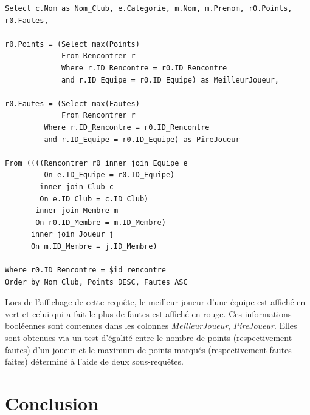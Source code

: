 \documentclass[a4paper»,8pt,french,fleqn]{report}
\begin{document}
\begin{lstlisting}
Select c.Nom as Nom_Club, e.Categorie, m.Nom, m.Prenom, r0.Points, r0.Fautes, 

r0.Points = (Select max(Points) 
             From Rencontrer r
             Where r.ID_Rencontre = r0.ID_Rencontre
             and r.ID_Equipe = r0.ID_Equipe) as MeilleurJoueur,

r0.Fautes = (Select max(Fautes) 
             From Rencontrer r
	     Where r.ID_Rencontre = r0.ID_Rencontre
	     and r.ID_Equipe = r0.ID_Equipe) as PireJoueur 
								
From ((((Rencontrer r0 inner join Equipe e
         On e.ID_Equipe = r0.ID_Equipe) 
        inner join Club c            
        On e.ID_Club = c.ID_Club) 
       inner join Membre m
       On r0.ID_Membre = m.ID_Membre) 
      inner join Joueur j
      On m.ID_Membre = j.ID_Membre)

Where r0.ID_Rencontre = $id_rencontre
Order by Nom_Club, Points DESC, Fautes ASC
\end{lstlisting}

Lors de l'affichage de cette requête, le meilleur joueur d'une équipe est affiché en vert et celui qui a fait le plus de fautes est affiché en rouge. Ces informations booléennes sont contenues dans les colonnes \textit{MeilleurJoueur}, \textit{PireJoueur}. Elles sont obtenues via un test d'égalité entre le nombre de points (respectivement fautes) d'un joueur et le maximum de points marqués (respectivement fautes faites) déterminé à l'aide de deux sous-requêtes.

\chapter*{Conclusion}
\end{document}
